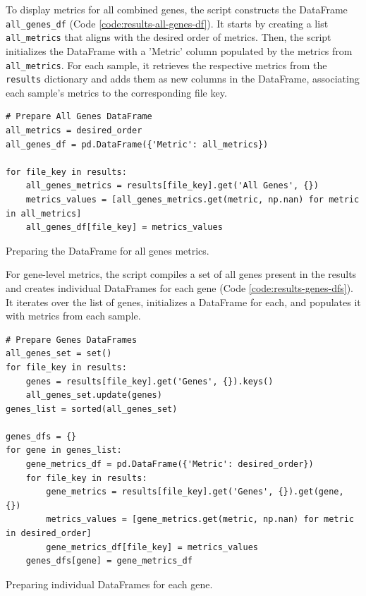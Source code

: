 To display metrics for all combined genes, the script constructs the DataFrame \texttt{all\_genes\_df} (Code \ref{code:results-all-genes-df}). It starts by creating a list \texttt{all\_metrics} that aligns with the desired order of metrics. Then, the script initializes the DataFrame with a 'Metric' column populated by the metrics from \texttt{all\_metrics}. For each sample, it retrieves the respective metrics from the \texttt{results} dictionary and adds them as new columns in the DataFrame, associating each sample's metrics to the corresponding file key.

\begin{longlisting}
\begin{verbatim}
# Prepare All Genes DataFrame
all_metrics = desired_order
all_genes_df = pd.DataFrame({'Metric': all_metrics})

for file_key in results:
    all_genes_metrics = results[file_key].get('All Genes', {})
    metrics_values = [all_genes_metrics.get(metric, np.nan) for metric in all_metrics]
    all_genes_df[file_key] = metrics_values
\end{verbatim}
\caption{Preparing the DataFrame for all genes metrics.}
\label{code:results-all-genes-df}
\end{longlisting}

For gene-level metrics, the script compiles a set of all genes present in the results and creates individual DataFrames for each gene (Code \ref{code:results-genes-dfs}). It iterates over the list of genes, initializes a DataFrame for each, and populates it with metrics from each sample.

\begin{longlisting}
\begin{verbatim}
# Prepare Genes DataFrames
all_genes_set = set()
for file_key in results:
    genes = results[file_key].get('Genes', {}).keys()
    all_genes_set.update(genes)
genes_list = sorted(all_genes_set)

genes_dfs = {}
for gene in genes_list:
    gene_metrics_df = pd.DataFrame({'Metric': desired_order})
    for file_key in results:
        gene_metrics = results[file_key].get('Genes', {}).get(gene, {})
        metrics_values = [gene_metrics.get(metric, np.nan) for metric in desired_order]
        gene_metrics_df[file_key] = metrics_values
    genes_dfs[gene] = gene_metrics_df
\end{verbatim}
\caption{Preparing individual DataFrames for each gene.}
\label{code:results-genes-dfs}
\end{longlisting}

